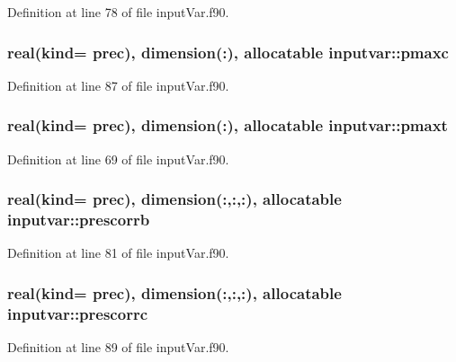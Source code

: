 Definition at line 78 of file input\-Var.\-f90.

\hypertarget{classinputvar_a93b555571bee30038d48c86de7ab5c14}{
\subsubsection[{pmaxc}]{\setlength{\rightskip}{0pt plus 5cm}real(kind= prec), dimension(\-:), allocatable inputvar\-::pmaxc}}\label{classinputvar_a93b555571bee30038d48c86de7ab5c14}


Definition at line 87 of file input\-Var.\-f90.

\hypertarget{classinputvar_a0a9434332c855a12ef886b675af68d35}{
\subsubsection[{pmaxt}]{\setlength{\rightskip}{0pt plus 5cm}real(kind= prec), dimension(\-:), allocatable inputvar\-::pmaxt}}\label{classinputvar_a0a9434332c855a12ef886b675af68d35}


Definition at line 69 of file input\-Var.\-f90.

\hypertarget{classinputvar_a4de979203fa5e65fe0cbfd77c60654ae}{
\subsubsection[{prescorrb}]{\setlength{\rightskip}{0pt plus 5cm}real(kind= prec), dimension(\-:,\-:,\-:), allocatable inputvar\-::prescorrb}}\label{classinputvar_a4de979203fa5e65fe0cbfd77c60654ae}


Definition at line 81 of file input\-Var.\-f90.

\hypertarget{classinputvar_a4ad15e4562f67332a82dd70d6cfcb2fc}{
\subsubsection[{prescorrc}]{\setlength{\rightskip}{0pt plus 5cm}real(kind= prec), dimension(\-:,\-:,\-:), allocatable inputvar\-::prescorrc}}\label{classinputvar_a4ad15e4562f67332a82dd70d6cfcb2fc}


Definition at line 89 of file input\-Var.\-f90.


